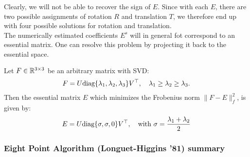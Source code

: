 Clearly, we will not be able to recover the sign of $E$.
Since with each $E$, there are two possible assignments of rotation $R$
and translation $T$, we therefore end up with four possible
solutions for rotation and translation.\\

The numerically estimated coefficients $E^s$ will in general fot correspond
to an essential matrix. One can resolve this problem by projecting
it back to the essential space.

\begin{theorem}
	Let $F \in \mathbb{R}^{3 \times{} 3}$ be an arbitrary matrix with SVD:
	\[
		F = U \text{diag} \{ \lambda_1, \lambda_2, \lambda_3 \} V^{\top}
		,\quad \lambda_1 \geq \lambda_2 \geq \lambda_3.
	\]
	Then the essential matrix $E$ which minimizes the Frobenius norm
	$\| F-E \|_f^2$, is given by:
	\[
		E = U \text{diag}\{ \sigma, \sigma, 0 \} V^{\top},\quad
		\text{with}\ \sigma = \frac{\lambda_1 + \lambda_2}{2}
	\]
\end{theorem}

\subsubsection*{Eight Point Algorithm (Longuet-Higgins '81) summary}%
\label{ssub:eight_point_algorithm}

